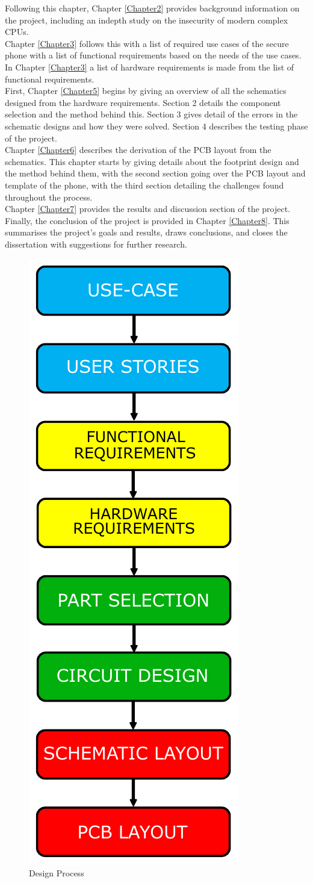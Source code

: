 Following this chapter, Chapter \ref{Chapter2} provides background information on the project, including an indepth study on the insecurity of modern complex CPUs.\\ 
Chapter \ref{Chapter3} follows this with a list of required use cases of the secure phone with a list of functional requirements based on the needs of the use cases.\\ 
In Chapter \ref{Chapter3} a list of hardware requirements is made from the list of functional requirements.\\
First, Chapter \ref{Chapter5} begins by giving an overview of all the schematics designed from the hardware requirements.
Section 2 details the component selection and the method behind this.
Section 3 gives detail of the errors in the schematic designs and how they were solved.
Section 4 describes the testing phase of the project.\\
Chapter \ref{Chapter6} describes the derivation of the PCB layout from the schematics.
This chapter starts by giving details about the footprint design and the method behind them, with the second section going over the PCB layout and template of the phone, with the third section detailing the challenges found throughout the process.\\
Chapter \ref{Chapter7} provides the results and discussion section of the project.\\
Finally, the conclusion of the project is provided in Chapter \ref{Chapter8}.
This summarises the project's goals and results, draws conclusions, and closes the dissertation with suggestions for further research.

\begin{figure}
	\includegraphics[width=0.5\linewidth]{Figures/first_table.pdf}\centering
	\caption{Design Process}
	\label{fig:methodology}
\end{figure}
